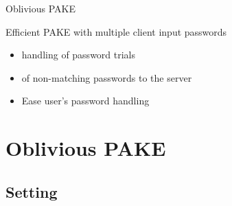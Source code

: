 \documentclass[notes]{beamer}
\begin{document}
\begin{frame}{Oblivious PAKE}{}

	\begin{beamerboxesrounded}[upper=uppercol,lower=lowercol,shadow=true]{}\centering
		Efficient PAKE with multiple client input passwords
	\end{beamerboxesrounded}

	
	\pause	
	\vspace*{2em}	
	
	
	\begin{itemize}
		\item {} handling of password trials
		\item {} of non-matching passwords to the server
		\item Ease user's password handling
	\end{itemize}
	
\end{frame}

\section{Oblivious PAKE}

\subsection{Setting}
\end{document}
